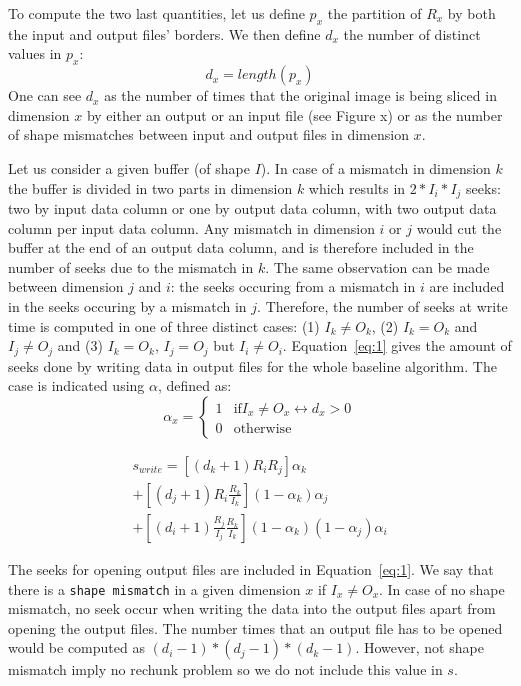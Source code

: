 \documentclass[conference]{IEEEtran}
\begin{document}
To compute the two last quantities, let us define $p_x$ the partition of $R_x$
by both the input and output files' borders. We then define $d_x$ the number of
distinct values in $p_x$:
$$d_x=length(p_x)$$
One can see $d_x$ as the number of times that the original image is being sliced
in dimension $x$ by either an output or an input file (see Figure x) or as the
number of shape mismatches between input and output files in dimension $x$.

Let us consider a given buffer (of shape $I$). In case of a mismatch in dimension
$k$ the buffer is divided in two parts in dimension $k$ which results in $2*I_i*I_j$
seeks: two by input data column or one by output data column, with two output
data column per input data column. Any mismatch in dimension $i$ or $j$ would
cut the buffer at the end of an output data column, and is therefore included in
the number of seeks due to the mismatch in $k$. The same observation can be made
between dimension $j$ and $i$: the seeks occuring from a mismatch in $i$ are
included in the seeks occuring by a mismatch in $j$. Therefore, the number of
seeks at write time is computed in one of three distinct cases:
(1) $I_k \neq O_k$, (2) $I_k = O_k$ and $I_j \neq O_j$ and (3) $I_k = O_k$,
$I_j = O_j$ but $I_i \neq O_i$. Equation~\ref{eq:1} gives the amount of seeks
done by writing data in output files for the whole baseline algorithm.
The case is indicated using $\alpha$, defined as: \\
$$\alpha_x = \begin{cases}
   1 & \mathrm{if} I_x \neq O_x \leftrightarrow d_x > 0 \\
   0 & \mathrm{otherwise}
\end{cases}$$

\begin{multline} \label{eq:1}
s_{write} = [(d_k+1)R_iR_j]\alpha_k \\ + [(d_j+1)R_i\frac{R_k}{I_k}](1-\alpha_k)\alpha_j \\ + [(d_i+1)\frac{R_j}{I_j}\frac{R_k}{I_k}](1-\alpha_k)(1-\alpha_j)\alpha_i
\end{multline}

The seeks for opening output files are included in Equation~\ref{eq:1}.
We say that there is a \texttt{shape mismatch} in a given dimension $x$ if
$I_x \neq O_x$.
In case of no shape mismatch, no seek occur when writing the data into the output
files apart from opening the output files. The number times that an output file
has to be opened would be computed as $(d_i-1)*(d_j-1)*(d_k-1)$. However, not
shape mismatch imply no rechunk problem so we do not include this value in $s$.
\end{document}
